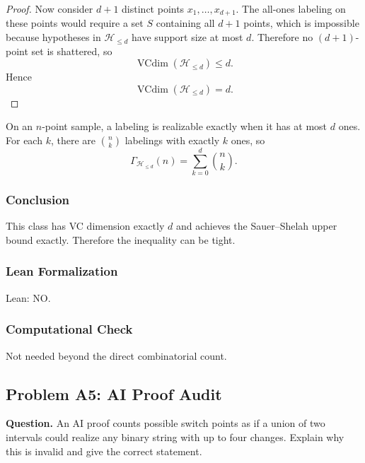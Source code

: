 \documentclass{article}
\newcommand{\vcdim}{\operatorname{VCdim}}
\newcommand{\growth}{\Gamma}
\begin{document}
\begin{solutionbox}
\begin{proof}
Now consider \(d+1\) distinct points \(x_1,\dots,x_{d+1}\). The all-ones
labeling on these points would require a set \(S\) containing all \(d+1\)
points, which is impossible because hypotheses in \(\mathcal{H}_{\le d}\) have
support size at most \(d\). Therefore no \((d+1)\)-point set is shattered, so
\[
\vcdim(\mathcal{H}_{\le d})\le d.
\]
Hence
\[
\vcdim(\mathcal{H}_{\le d})=d.
\]
\end{proof}

On an \(n\)-point sample, a labeling is realizable exactly when it has at most
\(d\) ones. For each \(k\), there are \(\binom{n}{k}\) labelings with exactly
\(k\) ones, so
\[
\growth_{\mathcal{H}_{\le d}}(n)=\sum_{k=0}^{d}\binom{n}{k}.
\]

\subsubsection{Conclusion}

This class has VC dimension exactly \(d\) and achieves the Sauer--Shelah upper
bound exactly. Therefore the inequality can be tight.

\subsubsection{Lean Formalization}

Lean: NO.

\subsubsection{Computational Check}

Not needed beyond the direct combinatorial count.

\end{solutionbox}

\subsection{Problem A5: AI Proof Audit}

\textbf{Question.}
\newline
An AI proof counts possible switch points as if a union of two intervals could
realize any binary string with up to four changes. Explain why this is invalid
and give the correct statement.
\end{document}
